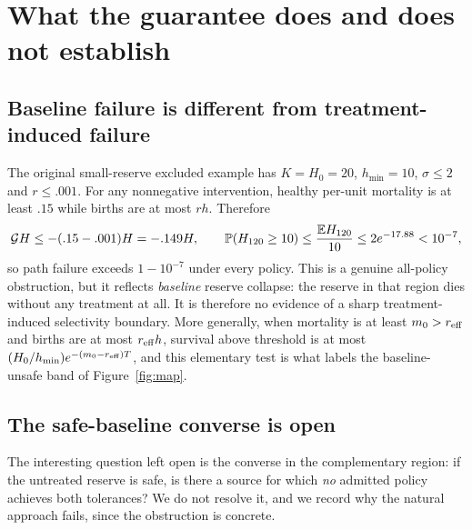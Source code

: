 \section{What the guarantee does and does not establish}\label{sec:limits}
\subsection{Baseline failure is different from treatment-induced failure}
The original small-reserve excluded example has $K=H_0=20$, $h_{\min}=10$, $\sigma\le2$ and $r\le.001$. For any nonnegative intervention, healthy per-unit mortality is at least $.15$ while births are at most $rh$. Therefore
\[
 \mathcal G H\le-(.15-.001)H=-.149H,\qquad
 \mathbb P(H_{120}\ge10)\le\frac{\mathbb E H_{120}}{10}\le2e^{-17.88}<10^{-7},
\]
so path failure exceeds $1-10^{-7}$ under every policy. This is a genuine all-policy obstruction, but it reflects \emph{baseline} reserve collapse: the reserve in that region dies without any treatment at all. It is therefore no evidence of a sharp treatment-induced selectivity boundary. More generally, when mortality is at least $m_0>r_{\mathrm{eff}}$ and births are at most $r_{\mathrm{eff}} h$, survival above threshold is at most $(H_0/h_{\min})e^{-(m_0-r_{\mathrm{eff}})T}$, and this elementary test is what labels the baseline-unsafe band of Figure~\ref{fig:map}.

\subsection{The safe-baseline converse is open}\label{sec:converse}
The interesting question left open is the converse in the complementary region: if the untreated reserve is safe, is there a source for which \emph{no} admitted policy achieves both tolerances? We do not resolve it, and we record why the natural approach fails, since the obstruction is concrete.


